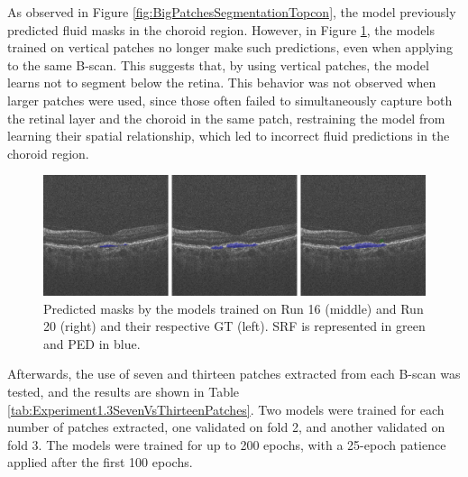\par
As observed in Figure \ref{fig:BigPatchesSegmentationTopcon}, the model previously predicted fluid masks in the choroid region. However, in Figure \ref{fig:VerticalPatchesSegmentationTopcon}, the models trained on vertical patches no longer make such predictions, even when applying to the same B-scan. This suggests that, by using vertical patches, the model learns not to segment below the retina. This behavior was not observed when larger patches were used, since those often failed to simultaneously capture both the retinal layer and the choroid in the same patch, restraining the model from learning their spatial relationship, which led to incorrect fluid predictions in the choroid region.

\begin{figure}
	\centering
	\includegraphics[width=1.0\linewidth]{figures/VerticalPatchesSegmentationTopcon.png}
	\caption{Predicted masks by the models trained on Run 16 (middle) and Run 20 (right) and their respective GT (left). SRF is represented in green and PED in blue.}
	\label{fig:VerticalPatchesSegmentationTopcon}
\end{figure}

Afterwards, the use of seven and thirteen patches extracted from each B-scan was tested, and the results are shown in Table \ref{tab:Experiment1.3SevenVsThirteenPatches}. Two models were trained for each number of patches extracted, one validated on fold 2, and another validated on fold 3. The models were trained for up to 200 epochs, with a 25-epoch patience applied after the first 100 epochs.


